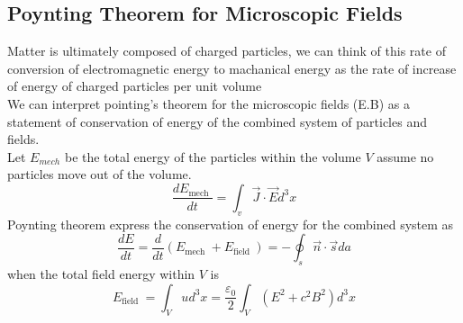 \subsection{Poynting Theorem for Microscopic Fields}
Matter is ultimately composed of charged particles, we can think of this rate of conversion of electromagnetic energy to machanical energy as the rate of increase of energy of charged particles per unit volume\\
We can interpret pointing's theorem for the microscopic fields (E.B) as a statement of conservation of energy of the combined system of particles and fields.\\
Let $E_{mech}$ be the total energy of the particles within the volume $V$ assume no particles move out of the volume.
$$\frac{d E_{\text {mech }}}{d t}=\int_{v} \vec{J} \cdot \vec{E} d^{3} x$$
Poynting theorem express the conservation of energy for the combined system as
$$\frac{d E}{d t}=\frac{d}{d t}\left(E_{\text {mech }}+E_{\text {field }}\right)=-\oint_{s} \vec{n} \cdot \vec{s} d a$$
when the total field energy within $V$ is
$$E_{\text {field } }=\int_{V} u d^{3} x=\frac{\varepsilon_{0}}{2} \int_{V}\left(E^{2}+c^{2} B^{2}\right) d^{3} x$$

